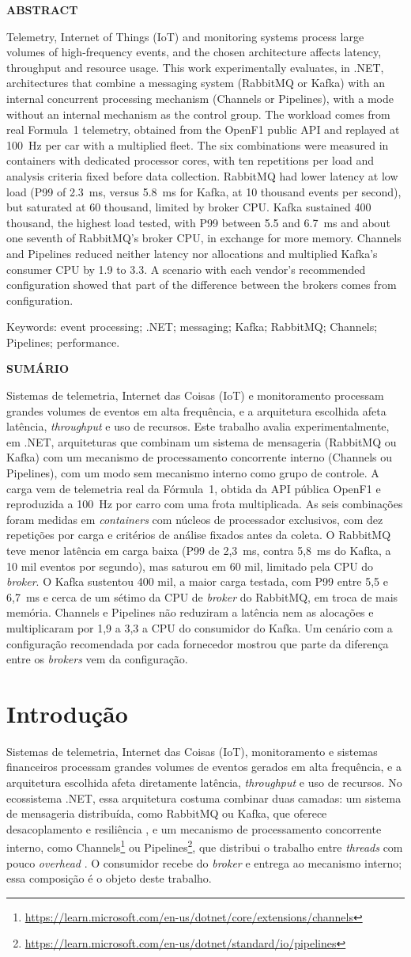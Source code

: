 \documentclass[12pt]{article}
\newcommand{\textoResumo}{Sistemas de telemetria, Internet das Coisas (IoT) e monitoramento processam grandes volumes de eventos em alta frequência, e a arquitetura escolhida afeta latência, \textit{throughput} e uso de recursos. Este trabalho avalia experimentalmente, em .NET, arquiteturas que combinam um sistema de mensageria (RabbitMQ ou Kafka) com um mecanismo de processamento concorrente interno (Channels ou Pipelines), com um modo sem mecanismo interno como grupo de controle. A carga vem de telemetria real da Fórmula~1, obtida da API pública OpenF1 e reproduzida a 100~Hz por carro com uma frota multiplicada. As seis combinações foram medidas em \textit{containers} com núcleos de processador exclusivos, com dez repetições por carga e critérios de análise fixados antes da coleta. O RabbitMQ teve menor latência em carga baixa (P99 de 2,3~ms, contra 5,8~ms do Kafka, a 10 mil eventos por segundo), mas saturou em 60 mil, limitado pela CPU do \textit{broker}. O Kafka sustentou 400 mil, a maior carga testada, com P99 entre 5,5 e 6,7~ms e cerca de um sétimo da CPU de \textit{broker} do RabbitMQ, em troca de mais memória. Channels e Pipelines não reduziram a latência nem as alocações e multiplicaram por 1,9 a 3,3 a CPU do consumidor do Kafka. Um cenário com a configuração recomendada por cada fornecedor mostrou que parte da diferença entre os \textit{brokers} vem da configuração.}
\newcommand{\textoAbstract}{Telemetry, Internet of Things (IoT) and monitoring systems process large volumes of high-frequency events, and the chosen architecture affects latency, throughput and resource usage. This work experimentally evaluates, in .NET, architectures that combine a messaging system (RabbitMQ or Kafka) with an internal concurrent processing mechanism (Channels or Pipelines), with a mode without an internal mechanism as the control group. The workload comes from real Formula~1 telemetry, obtained from the OpenF1 public API and replayed at 100~Hz per car with a multiplied fleet. The six combinations were measured in containers with dedicated processor cores, with ten repetitions per load and analysis criteria fixed before data collection. RabbitMQ had lower latency at low load (P99 of 2.3~ms, versus 5.8~ms for Kafka, at 10 thousand events per second), but saturated at 60 thousand, limited by broker CPU. Kafka sustained 400 thousand, the highest load tested, with P99 between 5.5 and 6.7~ms and about one seventh of RabbitMQ's broker CPU, in exchange for more memory. Channels and Pipelines reduced neither latency nor allocations and multiplied Kafka's consumer CPU by 1.9 to 3.3. A scenario with each vendor's recommended configuration showed that part of the difference between the brokers comes from configuration.}
\renewcommand{\contentsname}{SUMÁRIO}
\begin{document}
\newpage
\pagestyle{empty}

\centering
{\textbf{ABSTRACT} \par}
\vspace{1cm}
\justifying
\noindent
\textoAbstract

\noindent
Keywords: event processing; .NET; messaging; Kafka; RabbitMQ; Channels; Pipelines; performance.

\newpage
\pagestyle{empty}

\centering
{\textbf{SUMÁRIO} \par}
\justifying

\renewcommand{\contentsname}{}
\tableofcontents

\maketitle

\begin{abstract}
\textoAbstract
\end{abstract}

\begin{resumo}
\textoResumo
\end{resumo}


\section{Introdução}

Sistemas de telemetria, Internet das Coisas (IoT), monitoramento e sistemas financeiros
processam grandes volumes de eventos gerados em alta frequência, e a arquitetura escolhida
afeta diretamente latência, \textit{throughput} e uso de recursos. No ecossistema .NET, essa
arquitetura costuma combinar duas camadas: um sistema de mensageria distribuída, como
RabbitMQ ou Kafka, que oferece desacoplamento e resiliência \cite{dobbelaere:2017}, e um
mecanismo de processamento concorrente interno, como
Channels\footnote{\url{https://learn.microsoft.com/en-us/dotnet/core/extensions/channels}}
ou
Pipelines\footnote{\url{https://learn.microsoft.com/en-us/dotnet/standard/io/pipelines}},
que distribui o trabalho entre \textit{threads} com pouco \textit{overhead} \cite{cleary:2019}. O
consumidor recebe do \textit{broker} e entrega ao mecanismo interno; essa composição é o objeto
deste trabalho.
\end{document}
